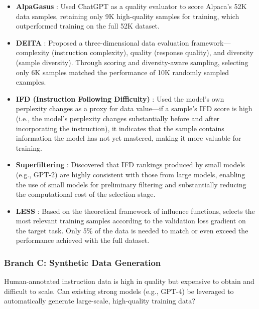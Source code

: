 \begin{itemize}[leftmargin=2em]
  \item \textbf{AlpaGasus} \cite{chen2024alpagasus}:
    Used ChatGPT as a quality evaluator to score Alpaca's 52K data samples,
    retaining only 9K high-quality samples for training, which outperformed training on the full 52K dataset.

  \item \textbf{DEITA} \cite{liu2024deita}:
    Proposed a three-dimensional data evaluation framework---complexity (instruction complexity),
    quality (response quality), and diversity (sample diversity).
    Through scoring and diversity-aware sampling, selecting only 6K samples matched the performance of 10K randomly sampled examples.

  \item \textbf{IFD (Instruction Following Difficulty)} \cite{li2023ifd}:
    Used the model's own perplexity changes as a proxy for data value---if a sample's IFD score is high (i.e., the model's perplexity changes substantially before and after incorporating the instruction),
    it indicates that the sample contains information the model has not yet mastered, making it more valuable for training.

  \item \textbf{Superfiltering} \cite{li2024superfiltering}:
    Discovered that IFD rankings produced by small models (e.g., GPT-2) are highly consistent with those from large models,
    enabling the use of small models for preliminary filtering and substantially reducing the computational cost of the selection stage.

  \item \textbf{LESS} \cite{xia2024less}:
    Based on the theoretical framework of influence functions,
    selects the most relevant training samples according to the validation loss gradient on the target task.
    Only 5\% of the data is needed to match or even exceed the performance achieved with the full dataset.
\end{itemize}

\subsubsection{Branch C: Synthetic Data Generation}
\label{sec:t7-synthetic}

\begin{problembox}
Human-annotated instruction data is high in quality but expensive to obtain and difficult to scale.
Can existing strong models (e.g., GPT-4) be leveraged to automatically generate large-scale, high-quality training data?
\end{problembox}

